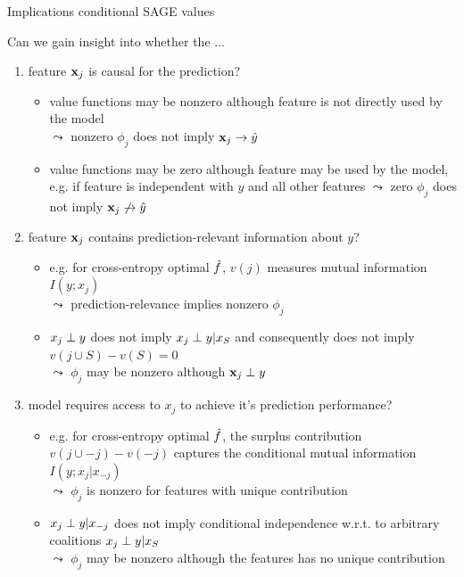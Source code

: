 \documentclass[11pt,compress,t,notes=noshow, aspectratio=169, xcolor=table]{beamer}
\begin{document}
\begin{frame}{Implications conditional SAGE values}

Can we gain insight into whether the ...

\begin{enumerate}
    \item<1> feature $\xj$ is causal for the prediction?
    \begin{itemize}
      \item value functions may be nonzero although feature is not directly used by the model\\
      $\leadsto$ nonzero $\phi_j$ does not imply $\xj \rightarrow \hat{y}$
      \item value functions may be zero although feature may be used by the model, e.g. if feature is independent with $y$ and all other features $\leadsto$ zero $\phi_j$ does not imply $\xj \not \rightarrow \hat{y}$
    \end{itemize}
    \item<2> feature $\xj$ contains prediction-relevant information about $y$?
    \begin{itemize}
      \item e.g. for cross-entropy optimal $\fh$, $v(j)$ measures mutual information $I(y;x_j)$\\
      $\leadsto$ prediction-relevance implies nonzero $\phi_j$
      \item $x_j \indep y$ does not imply $x_j \indep y | x_S$ and consequently does not imply $v(j \cup S) - v(S) = 0$\\
      $\leadsto$ $\phi_j$ may be nonzero although $\xj \indep y$
    \end{itemize}
    \item<3> model requires access to $x_j$ to achieve it's prediction performance?  
    \begin{itemize}
        \item e.g. for cross-entropy optimal $\fh$, the surplus contribution $v(j \cup -j) - v(-j)$ captures the conditional mutual information $I(y;x_j|x_{-j})$\\
        $\leadsto$ $\phi_j$ is nonzero for features with unique contribution
        \item $x_j \indep y | x_{-j}$ does not imply conditional independence w.r.t. to arbitrary coalitions $x_j \indep y | x_S$\\
        $\leadsto$ $\phi_j$ may be nonzero although the features has no unique contribution
    \end{itemize}
\end{enumerate}

\end{frame}
\end{document}
